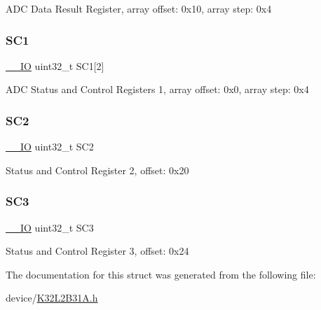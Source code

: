 A\+DC Data Result Register, array offset\+: 0x10, array step\+: 0x4 \mbox{\label{struct_a_d_c___type_ac2f336dedf67a3b6dc792098c25f1197}} 
\subsubsection{\texorpdfstring{SC1}{SC1}}
{\footnotesize\ttfamily \mbox{\hyperlink{core__cm0plus_8h_aec43007d9998a0a0e01faede4133d6be}{\+\_\+\+\_\+\+IO}} uint32\+\_\+t S\+C1\mbox{[}2\mbox{]}}

A\+DC Status and Control Registers 1, array offset\+: 0x0, array step\+: 0x4 \mbox{\label{struct_a_d_c___type_ab3540714d43d0b62818c72e8dc20d90a}} 
\subsubsection{\texorpdfstring{SC2}{SC2}}
{\footnotesize\ttfamily \mbox{\hyperlink{core__cm0plus_8h_aec43007d9998a0a0e01faede4133d6be}{\+\_\+\+\_\+\+IO}} uint32\+\_\+t S\+C2}

Status and Control Register 2, offset\+: 0x20 \mbox{\label{struct_a_d_c___type_ac9553a6641fb9da34cb7a0b63c7b2d4e}} 
\subsubsection{\texorpdfstring{SC3}{SC3}}
{\footnotesize\ttfamily \mbox{\hyperlink{core__cm0plus_8h_aec43007d9998a0a0e01faede4133d6be}{\+\_\+\+\_\+\+IO}} uint32\+\_\+t S\+C3}

Status and Control Register 3, offset\+: 0x24 

The documentation for this struct was generated from the following file\+:\begin{DoxyCompactItemize}
\item 
device/\mbox{\hyperlink{_k32_l2_b31_a_8h}{K32\+L2\+B31\+A.\+h}}\end{DoxyCompactItemize}
